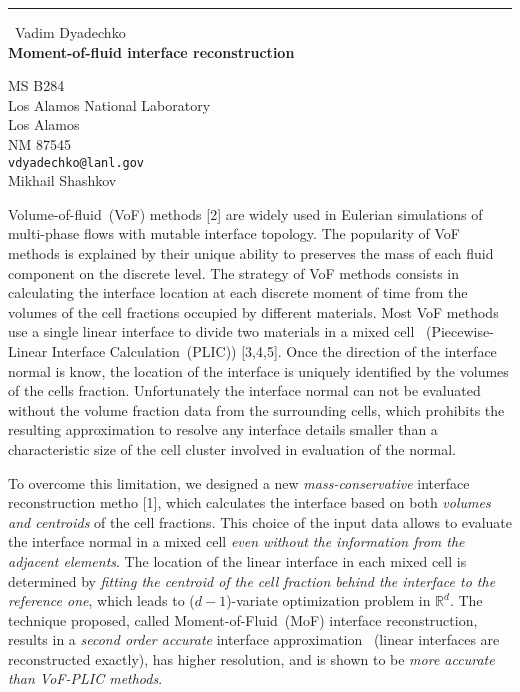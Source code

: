 \documentclass{report}
\begin{document}
\begin{center}
\rule{6in}{1pt} \
{\large Vadim Dyadechko \\
{\bf Moment-of-fluid interface reconstruction}}

MS B284 \\ Los Alamos National Laboratory \\ Los Alamos \\ NM 87545
\\
{\tt vdyadechko@lanl.gov}\\
Mikhail Shashkov\end{center}

\newcommand{\R}{\mathbb R}
\renewcommand{\tau}{\Delta t}
\newcommand{\centroid}[1]{\x_c(#1)}
\renewcommand{\vec}[1]{{\bf#1}}
\newcommand{\x}{\vec{x}}
Volume-of-fluid~(VoF) methods
[2]
are widely used in
Eulerian simulations
of multi-phase flows
with mutable
interface topology.
The popularity of VoF methods
is explained
by their unique ability to preserves
the mass of each fluid component
on the discrete level.
The strategy of VoF methods consists in
calculating the interface location
at each discrete moment of time
from the
volumes of the cell fractions
occupied by different materials.
Most
VoF methods
use a single linear interface
to divide two materials in a mixed cell%
~(Piecewise-Linear Interface Calculation~(PLIC))
[3,4,5].
Once the direction of the interface
normal
is know,
the location of the interface is uniquely
identified by the
volumes of the cells fraction.
Unfortunately the interface normal can not be evaluated
without the volume fraction data from the
surrounding cells,
which prohibits
the resulting approximation
to resolve any interface details
smaller than a characteristic size
of the cell cluster involved in
evaluation of the normal.

To overcome this limitation, we designed a new \emph{mass-conservative}
interface reconstruction metho
[1],
which calculates the interface based
on both \emph{volumes and centroids} of the cell fractions.
This choice of the input data
allows to evaluate the interface normal in a mixed cell
\emph{even without the information from the adjacent elements}.
The location of the linear interface in each mixed cell
is determined by \emph{fitting the centroid of the cell fraction
behind the interface to the reference one},
which leads to ($d\!-\!1$)-variate optimization problem in $\R^d$.
The technique proposed,
called Moment-of-Fluid~(MoF) interface reconstruction,
results in a \emph{second order accurate}
interface approximation~%
(linear interfaces are reconstructed exactly),
has higher resolution,
and is shown to be \emph{more accurate than VoF-PLIC methods}.
\end{document}
